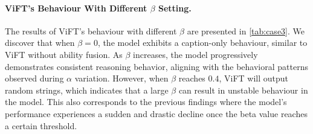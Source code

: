 \paragraph{ViFT's Behaviour With Different $\beta$ Setting.}

The results of ViFT's behaviour with different $\beta$ are presented in \autoref{tab:case3}. We discover that when $\beta=0$, the model exhibits a caption-only behaviour, similar to ViFT without ability fusion. As $\beta$ increases, the model progressively demonstrates consistent reasoning behavior, aligning with the behavioral patterns observed during $\alpha$ variation. However, when $\beta$ reaches $0.4$, ViFT will output random strings, which indicates that a large $\beta$ can result in unstable behaviour in the model. This also corresponds to the previous findings where the model's performance experiences a sudden and drastic decline once the beta value reaches a certain threshold.


